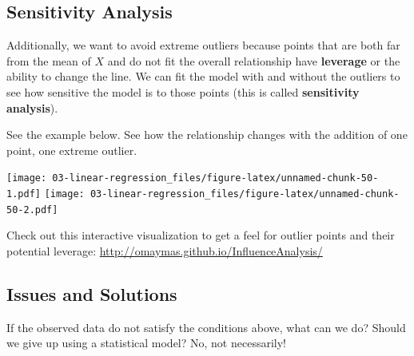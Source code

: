 \documentclass[
]{book}
\begin{document}
\hypertarget{sensitivity-analysis}{%
\subsection{Sensitivity Analysis}\label{sensitivity-analysis}}

Additionally, we want to avoid extreme outliers because points that are both far from the mean of \(X\) and do not fit the overall relationship have \textbf{leverage} or the ability to change the line. We can fit the model with and without the outliers to see how sensitive the model is to those points (this is called \textbf{sensitivity analysis}).

See the example below. See how the relationship changes with the addition of one point, one extreme outlier.

\texttt{[image: 03-linear-regression\_files/figure-latex/unnamed-chunk-50-1.pdf]} \texttt{[image: 03-linear-regression\_files/figure-latex/unnamed-chunk-50-2.pdf]}

Check out this interactive visualization to get a feel for outlier points and their potential leverage: \url{http://omaymas.github.io/InfluenceAnalysis/}

\hypertarget{issues-and-solutions}{%
\subsection{Issues and Solutions}\label{issues-and-solutions}}

If the observed data do not satisfy the conditions above, what can we do? Should we give up using a statistical model? No, not necessarily!
\end{document}
